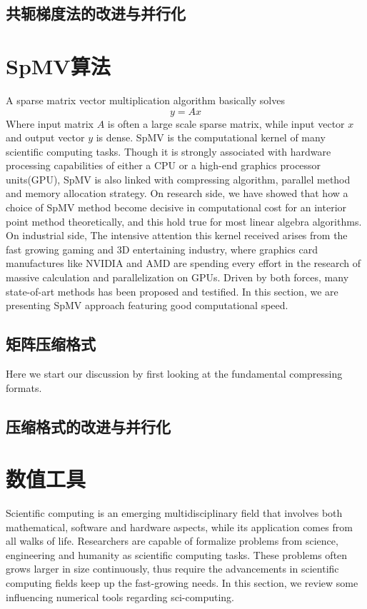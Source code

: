 \subsection{共轭梯度法的改进与并行化}
\section{SpMV算法}
A sparse matrix vector multiplication algorithm basically solves 
\begin{equation}
y=Ax
\end{equation}
Where input matrix $A$ is often a large scale sparse matrix, while input vector $x$ and output vector $y$ is dense. SpMV is the computational kernel of many scientific computing tasks. Though it is strongly associated with hardware processing capabilities of either a CPU or a high-end graphics processor units(GPU)\parencite{yang2011fast}, SpMV is also linked with compressing algorithm, parallel method and memory allocation strategy. On research side, we have showed that how a choice of SpMV method become decisive in computational cost for an interior point method theoretically, and this hold true for most linear algebra algorithms. On industrial side, The intensive attention this kernel received arises from the fast growing gaming and 3D entertaining industry, where graphics card manufactures like NVIDIA and AMD are spending every effort in the research of massive calculation and parallelization on GPUs. Driven by both forces, many state-of-art methods has been proposed and testified. In this section, we are presenting SpMV approach featuring good computational speed.
\subsection{矩阵压缩格式}
Here we start our discussion by first looking at the fundamental compressing formats.
\subsection{压缩格式的改进与并行化}


\section{数值工具}
Scientific computing is an emerging multidisciplinary field that involves both mathematical, software and hardware aspects, while its application comes from all walks of life. Researchers are capable of formalize problems from science, engineering and humanity as scientific computing tasks. These problems often grows larger in size continuously, thus require the advancements in scientific computing fields keep up the fast-growing needs. In this section, we review some influencing numerical tools regarding sci-computing. 

